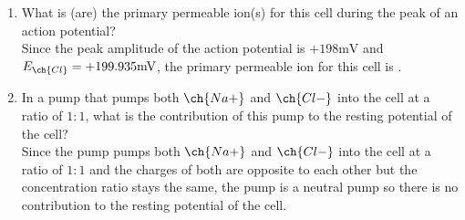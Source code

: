 \documentclass[11pt]{article}
\begin{document}
\begin{enumerate}[label=\arabic*.]
\begin{enumerate}[label=(\alph*)]
\item
What is (are) the primary permeable ion(s) for this cell during the peak of an action potential?
\vspace*{1\baselineskip}
\\
Since the peak amplitude of the action potential is $+198 \text{mV}$ and $E_{\ch{Cl}} = +199.935 \text{mV}$, the primary permeable ion for this cell is .
\\



\item
In a pump that pumps both $\ch{Na+}$ and $\ch{Cl-}$ into the cell at a ratio of $1 : 1$, what is the contribution of this pump to the resting potential of the cell?
\vspace*{1\baselineskip}
\\
Since the pump pumps both $\ch{Na+}$ and $\ch{Cl-}$ into the cell at a ratio of $1 : 1$ and the charges of both are opposite to each other but the concentration ratio stays the same, the pump is a neutral pump so there is no contribution to the resting potential of the cell.
\\




\end{enumerate}
\end{enumerate}
\end{document}
